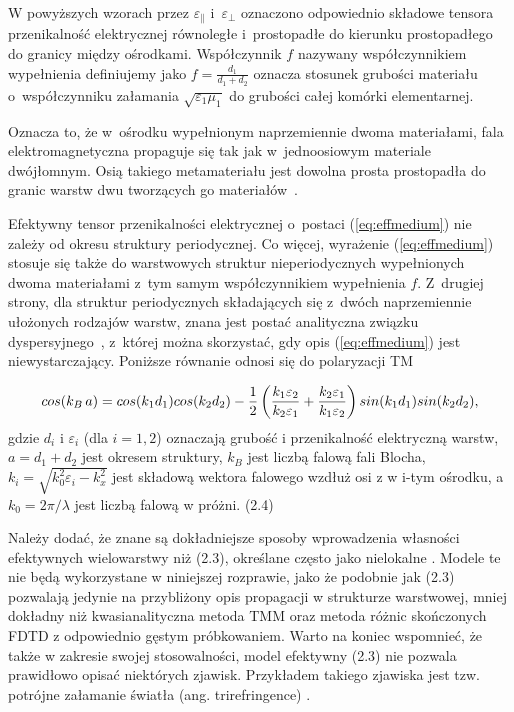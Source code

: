 W powyższych wzorach przez $\varepsilon_{\parallel}$ i~$\varepsilon_{\perp}$ oznaczono odpowiednio składowe tensora przenikalność elektrycznej równoległe i~prostopadłe do kierunku prostopadłego do granicy między ośrodkami. Współczynnik $f$ nazywany współczynnikiem wypełnienia definiujemy jako $f=\frac{d_1}{d_1+d_2}$ oznacza stosunek grubości materiału o~współczynniku załamania $\sqrt{\varepsilon_1 \mu_1}$ do grubości całej komórki elementarnej.

Oznacza to, że w~ośrodku wypełnionym naprzemiennie dwoma materiałami, fala elektromagnetyczna propaguje się tak jak w~jednoosiowym materiale dwójłomnym. Osią takiego metamateriału jest dowolna prosta prostopadła do granic warstw dwu tworzących go materiałów~\cite{sihvola1999electromagnetic}.

Efektywny tensor przenikalności elektrycznej o~postaci (\ref{eq:effmedium}) nie zależy od okresu struktury periodycznej. Co więcej, wyrażenie (\ref{eq:effmedium}) stosuje się  także do warstwowych struktur nieperiodycznych wypełnionych dwoma materiałami z~tym samym współczynnikiem wypełnienia $f$. Z~drugiej strony, dla struktur periodycznych składających się z~dwóch naprzemiennie ułożonych rodzajów warstw, znana jest postać analityczna związku dyspersyjnego~\cite{pastuszczak2011optimized}, z~której można skorzystać, gdy opis (\ref{eq:effmedium}) jest niewystarczający. Poniższe równanie odnosi się do polaryzacji TM

\begin{equation}
cos(k_{B} \,a) = cos(k_{1} d_1) cos(k_{2} d_2) \\
- \frac{1}{2} \left(\frac{k_{1} \varepsilon_2}{k_{2} \varepsilon_1} + \frac{k_{2} \varepsilon_1}{k_{1} \varepsilon_2}\right)
sin(k_{1} d_1) sin(k_{2} d_2),
\label{eq_dispersion}
\end{equation}
gdzie $d_i$ i $\varepsilon_i$ (dla $i=1,2$) oznaczają grubość i przenikalność elektryczną warstw, $a=d_1+d_2$ jest okresem struktury, $k_B$ jest liczbą falową fali Blocha, $k_i = \sqrt{k_0^2 \varepsilon_i-k_{x}^2}$ jest składową wektora falowego wzdłuż osi z w i-tym ośrodku, a $k_0=2\pi/\lambda$ jest liczbą falową w próżni. 
 (2.4)

Należy dodać, że znane są dokładniejsze sposoby wprowadzenia własności efektywnych wielowarstwy niż (2.3), określane często jako nielokalne \cite{elser2007nonlocal,chebykin2011nonlocal}. Modele te nie będą wykorzystane w niniejszej rozprawie, jako że podobnie jak (2.3) pozwalają jedynie na przybliżony opis propagacji w strukturze warstwowej, mniej dokładny niż kwasianalityczna metoda TMM oraz metoda różnic skończonych FDTD z odpowiednio gęstym próbkowaniem. 
Warto na koniec wspomnieć, że także w zakresie swojej stosowalności, model efektywny (2.3) nie pozwala prawidłowo opisać niektórych zjawisk. Przykładem takiego zjawiska jest tzw. potrójne załamanie światła (ang. trirefringence) \cite{netti2001optical,diaz2016some}.




